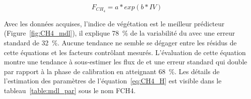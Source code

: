 \begin{equation} \label{eq:CH4_H}
F_{CH_{4}} = a*exp(b*IV)
\end{equation}

Avec les données acquises, l'indice de végétation est le meilleur prédicteur (Figure~\ref{fig:CH4_mdl}), il explique \SI{78}{\percent} de la variabilité du \chh avec une erreur standard de \SI{32}{\percent}.
Aucune tendance ne semble se dégager entre les résidus de cette équations et les facteurs contrôlant mesurés.
L'évaluation de cette équation montre une tendance à sous-estimer les flux de \chh et une erreur standard qui double par rapport à la phase de calibration en atteignant \SI{68}{\percent}.
Les détails de l'estimation des paramètres de l'équation~\ref{eq:CH4_H} est visible dans le tableau~\ref{table:mdl_par} sous le nom FCH4.


